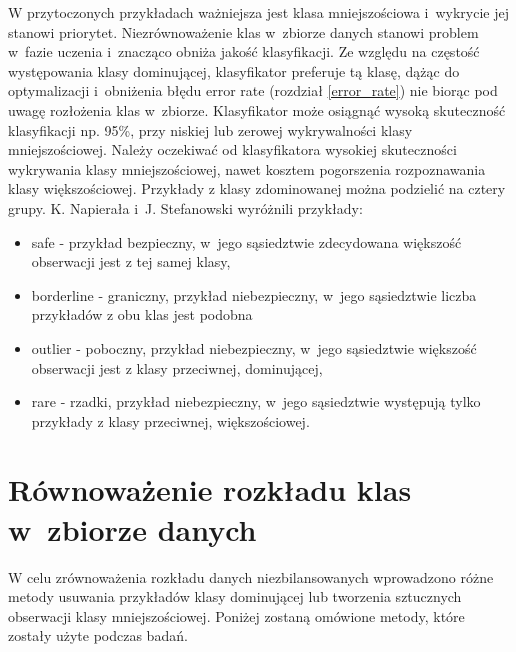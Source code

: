 W przytoczonych przykładach ważniejsza jest klasa mniejszościowa i~wykrycie jej stanowi priorytet. Niezrównoważenie klas w zbiorze danych stanowi problem w fazie uczenia i znacząco obniża jakość klasyfikacji. Ze względu na częstość występowania klasy dominującej, klasyfikator preferuje tą klasę, dążąc do optymalizacji i~obniżenia błędu error rate (rozdział \ref{error_rate}) nie biorąc pod uwagę rozłożenia klas w~zbiorze. Klasyfikator może osiągnąć wysoką skuteczność klasyfikacji np. 95\%, przy niskiej lub zerowej wykrywalności klasy mniejszościowej. 
Należy oczekiwać od klasyfikatora wysokiej skuteczności wykrywania klasy mniejszościowej, nawet kosztem pogorszenia rozpoznawania klasy większościowej.
Przykłady z klasy zdominowanej można podzielić na cztery grupy. K. Napierała i~J. Stefanowski wyróżnili przykłady\cite{przykladyklas}:
\begin{itemize}
	\item safe - przykład bezpieczny, w~jego sąsiedztwie zdecydowana większość obserwacji jest z tej samej klasy,
	\item borderline - graniczny, przykład niebezpieczny, w~jego sąsiedztwie liczba przykładów z obu klas jest podobna
	\item outlier - poboczny, przykład niebezpieczny, w~jego sąsiedztwie większość obserwacji jest z klasy przeciwnej, dominującej,
	\item rare - rzadki, przykład niebezpieczny, w~jego sąsiedztwie występują tylko przykłady z klasy przeciwnej, większościowej.
\end{itemize}

\section{Równoważenie rozkładu klas w~zbiorze danych}
\label{rozdzialopissamplingu}
W celu zrównoważenia rozkładu danych niezbilansowanych wprowadzono różne metody usuwania przykładów klasy dominującej lub tworzenia sztucznych obserwacji klasy mniejszościowej. Poniżej zostaną omówione metody, które zostały użyte podczas badań.
